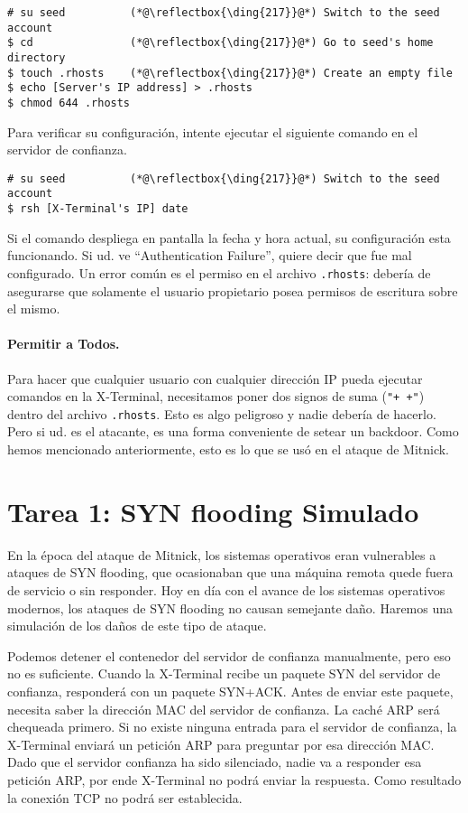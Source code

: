 \begin{lstlisting}
# su seed          (*@\reflectbox{\ding{217}}@*) Switch to the seed account
$ cd               (*@\reflectbox{\ding{217}}@*) Go to seed's home directory
$ touch .rhosts    (*@\reflectbox{\ding{217}}@*) Create an empty file 
$ echo [Server's IP address] > .rhosts
$ chmod 644 .rhosts
\end{lstlisting}

Para verificar su configuración, intente ejecutar el siguiente comando en el servidor de confianza.
\begin{lstlisting}
# su seed          (*@\reflectbox{\ding{217}}@*) Switch to the seed account
$ rsh [X-Terminal's IP] date
\end{lstlisting}

Si el comando despliega en pantalla la fecha y hora actual, su configuración esta funcionando. Si ud. ve  ``Authentication Failure'', quiere decir que fue mal configurado.
Un error común es el permiso en el archivo \texttt{.rhosts}: debería de asegurarse que solamente el usuario propietario posea permisos de escritura sobre el mismo.

\paragraph{Permitir a Todos.} Para hacer que cualquier usuario con cualquier dirección IP pueda ejecutar comandos en la X-Terminal, necesitamos poner dos signos de suma (\texttt{"+ +"}) dentro del archivo \texttt{.rhosts}. Esto es algo peligroso y nadie debería de hacerlo. Pero si ud. es el atacante, es una forma conveniente de setear un backdoor. Como hemos mencionado anteriormente, esto es lo que se usó en el ataque de Mitnick.


\section{Tarea 1: SYN flooding Simulado}

En la época del ataque de Mitnick, los sistemas operativos eran vulnerables a ataques de SYN flooding, que ocasionaban que una máquina remota quede fuera de servicio o sin responder.
Hoy en día con el avance de los sistemas operativos modernos, los ataques de SYN flooding no causan semejante daño.
Haremos una simulación de los daños de este tipo de ataque.

Podemos detener el contenedor del servidor de confianza manualmente, pero eso no es suficiente.
Cuando la X-Terminal recibe un paquete SYN del servidor de confianza, responderá con un paquete SYN+ACK. Antes de enviar este paquete, necesita saber la dirección MAC del servidor de confianza.
La caché ARP será chequeada primero. Si no existe ninguna entrada para el servidor de confianza, la X-Terminal enviará un petición ARP para preguntar por esa dirección MAC. Dado que el servidor confianza ha sido silenciado, nadie va a responder esa petición ARP, por ende X-Terminal no podrá enviar la respuesta. Como resultado la conexión TCP no podrá ser establecida.

